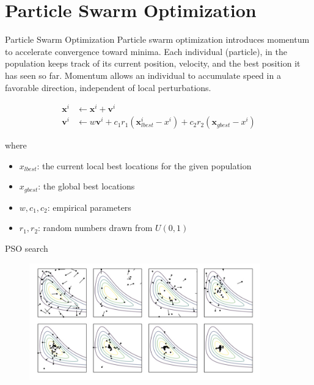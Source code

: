 \documentclass{beamer}
\begin{document}
\section{Particle Swarm Optimization}
\begin{frame}{Particle Swarm Optimization}
Particle swarm optimization introduces momentum to accelerate convergence toward minima. Each individual (particle), in the population keeps track of its current position, velocity, and the best position it has seen so far. Momentum allows an individual to accumulate speed in a favorable direction, independent of local perturbations.

\begin{equation*}
\begin{split}
    \boldsymbol{x}^i & \leftarrow \boldsymbol{x}^i + \boldsymbol{v}^i \\
    \boldsymbol{v}^i & \leftarrow w\boldsymbol{v}^i + c_1 r_1 (\boldsymbol{x}_{lbest}^i - x^i) + c_2 r_2(\boldsymbol{x}_{gbest} - x^i)
\end{split}
\end{equation*}

where 
\begin{itemize}
    \item $x_{lbest}$: the current local best locations for the given population
    \item $x_{gbest}$: the global best locations
    \item $w, c_1, c_2$: empirical parameters
    \item $r_1, r_2$: random numbers drawn from $U(0, 1)$
\end{itemize}

\end{frame}

\begin{frame}{PSO search}
\begin{figure}
\centering
\includegraphics[width=100mm]{Lecture_notes/Figs/pso.jpeg}
\end{figure}   
\end{frame}
\end{document}
